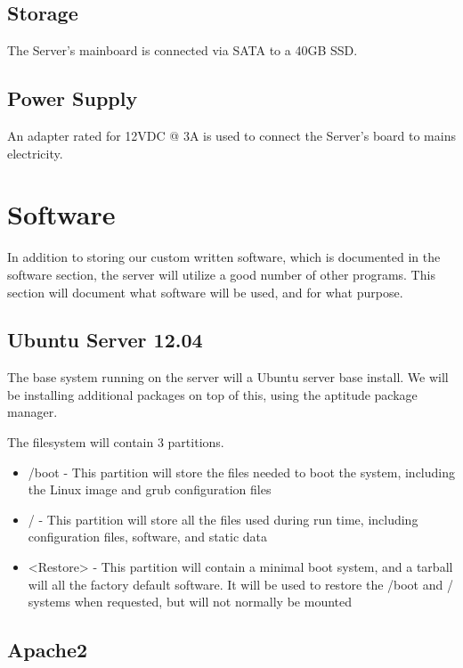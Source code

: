\subsection{Storage}
The Server's mainboard is connected via \ac{SATA} to a 40GB \ac{SSD}.

\subsection{Power Supply}
An adapter rated for 12\ac{VDC} @ 3\ac{A} is used to connect the Server's board to mains electricity.

\section{Software}

In addition to storing our custom written software, which is documented in the software section, the server will utilize a good number of other programs. 
This section will document what software will be used, and for what purpose.

\subsection{Ubuntu Server 12.04}

The base system running on the server will a Ubuntu server base install. 
We will be installing additional packages on top of this, using the aptitude package manager.

The filesystem will contain 3 partitions.

\begin{itemize}
 \item /boot - This partition will store the files needed to boot the system, including the Linux image and grub configuration files
 \item / - This partition will store all the files used during run time, including configuration files, software, and static data
 \item <Restore> - This partition will contain a minimal boot system, and a tarball will all the factory default software. It will be used to restore the /boot and / systems when requested, but will not normally be mounted
\end{itemize}

\subsection{Apache2}

